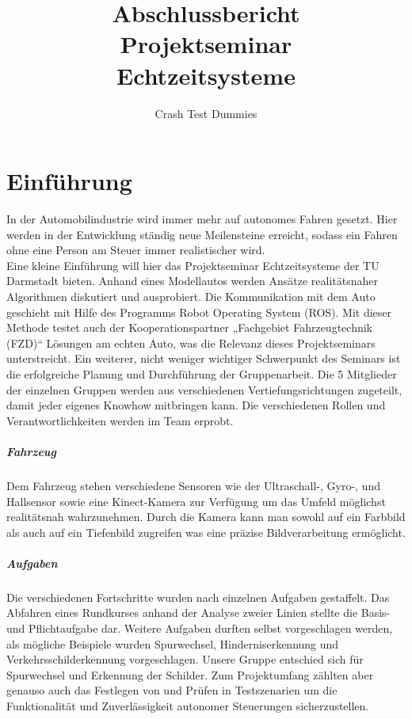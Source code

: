 \documentclass[nochapterpage,bigchapter,linedtoc,longdoc,colorback,accentcolor=tud4c]{tudreport}
\title{Abschlussbericht\\Projektseminar\\Echtzeitsysteme}
\subtitle{Crash Test Dummies}
\begin{document}
\maketitle 

\tableofcontents

  \chapter{Einführung}
  
  In der Automobilindustrie wird immer mehr auf autonomes Fahren gesetzt. Hier werden in der Entwicklung ständig neue Meilensteine erreicht, sodass ein Fahren ohne eine Person am Steuer immer realistischer wird.
  \\
  
  Eine kleine Einführung will hier das Projektseminar Echtzeitsysteme der TU Darmstadt bieten. Anhand eines Modellautos werden Ansätze realitätsnaher Algorithmen diskutiert und ausprobiert. Die Kommunikation mit dem Auto geschieht mit Hilfe des Programms Robot Operating System (ROS). Mit dieser Methode testet auch der Kooperationspartner „Fachgebiet Fahrzeugtechnik (FZD)“ Lösungen am echten Auto, was die Relevanz dieses Projektseminars unterstreicht.
  Ein weiterer, nicht weniger wichtiger Schwerpunkt des Seminars ist die erfolgreiche Planung und Durchführung der Gruppenarbeit. Die 5 Mitglieder der einzelnen Gruppen werden aus verschiedenen Vertiefungsrichtungen zugeteilt, damit jeder eigenes Knowhow mitbringen kann. Die verschiedenen Rollen und Verantwortlichkeiten werden im Team erprobt.
  
  \paragraph{Fahrzeug}
  Dem Fahrzeug stehen verschiedene Sensoren wie der Ultraschall-, Gyro-, und Hallsensor sowie eine Kinect-Kamera zur Verfügung um das Umfeld möglichst realitätsnah wahrzunehmen. Durch die Kamera kann man sowohl auf ein Farbbild als auch auf ein Tiefenbild zugreifen was eine präzise Bildverarbeitung ermöglicht.
  
  \paragraph{Aufgaben}
  Die verschiedenen Fortschritte wurden nach einzelnen Aufgaben gestaffelt. Das Abfahren eines Rundkurses anhand der Analyse zweier Linien stellte die Basis- und Pflichtaufgabe dar. Weitere Aufgaben durften selbst vorgeschlagen werden, als mögliche Beispiele wurden Spurwechsel, Hinderniserkennung und Verkehrsschilderkennung vorgeschlagen.
  Unsere Gruppe entschied sich für Spurwechsel und Erkennung der Schilder.
  Zum Projektumfang zählten aber genauso auch das Festlegen von und Prüfen in Testszenarien um die Funktionalität und Zuverlässigkeit autonomer Steuerungen sicherzustellen.  
  
\end{document}
